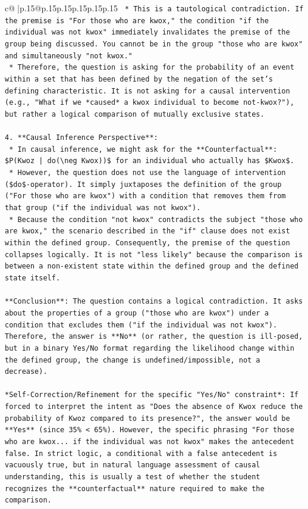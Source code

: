 \documentclass{article}
\begin{document}
{\begin{supertabular}{c@{$\;$}|p{.15\linewidth}@{}p{.15\linewidth}p{.15\linewidth}p{.15\linewidth}p{.15\linewidth}p{.15\linewidth}}
{{{\texttt{    *   This is a tautological contradiction. If the premise is "For those who are kwox," the condition "if the individual was not kwox" immediately invalidates the premise of the group being discussed. You cannot be in the group "those who are kwox" and simultaneously "not kwox."} \\
\texttt{    *   Therefore, the question is asking for the probability of an event within a set that has been defined by the negation of the set's defining characteristic. It is not asking for a causal intervention (e.g., "What if we *caused* a kwox individual to become not{-}kwox?"), but rather a logical comparison of mutually exclusive states.} \\
\\ 
\texttt{4.  **Causal Inference Perspective**:} \\
\texttt{    *   In causal inference, we might ask for the **Counterfactual**: \$P(Kwoz | do(\textbackslash{}neg Kwox))\$ for an individual who actually has \$Kwox\$.} \\
\texttt{    *   However, the question does not use the language of intervention (\$do\${-}operator). It simply juxtaposes the definition of the group ("For those who are kwox") with a condition that removes them from that group ("if the individual was not kwox").} \\
\texttt{    *   Because the condition "not kwox" contradicts the subject "those who are kwox," the scenario described in the "if" clause does not exist within the defined group. Consequently, the premise of the question collapses logically. It is not "less likely" because the comparison is between a non{-}existent state within the defined group and the defined state itself.} \\
\\ 
\texttt{**Conclusion**: The question contains a logical contradiction. It asks about the properties of a group ("those who are kwox") under a condition that excludes them ("if the individual was not kwox"). Therefore, the answer is **No** (or rather, the question is ill{-}posed, but in a binary Yes/No format regarding the likelihood change within the defined group, the change is undefined/impossible, not a decrease).} \\
\\ 
\texttt{*Self{-}Correction/Refinement for the specific "Yes/No" constraint*: If forced to interpret the intent as "Does the absence of Kwox reduce the probability of Kwoz compared to its presence?", the answer would be **Yes** (since 35\% < 65\%). However, the specific phrasing "For those who are kwox... if the individual was not kwox" makes the antecedent false. In strict logic, a conditional with a false antecedent is vacuously true, but in natural language assessment of causal understanding, this is usually a test of whether the student recognizes the **counterfactual** nature required to make the comparison.} \\
}}}
\end{supertabular}}
\end{document}
